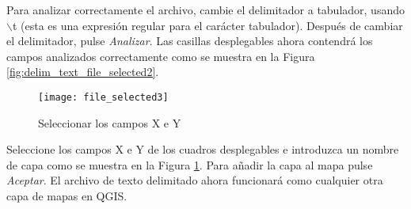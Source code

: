 Para analizar correctamente el archivo, cambie el delimitador a tabulador, 
usando \mbox{$\backslash$}t (esta es una expresión regular para el carácter 
tabulador). Después de cambiar el delimitador, pulse {\em Analizar}. Las 
casillas desplegables ahora contendrá los campos analizados correctamente como 
se muestra en la Figura \ref{fig:delim_text_file_selected2}.

\begin{figure}[ht]
   \begin{center}
   \caption{Seleccionar los campos X e Y}\label{fig:delim_text_file_selected3}\smallskip
\texttt{[image: file\_selected3]}
   \end{center}  
\end{figure}

Seleccione los campos X e Y de los cuadros desplegables e introduzca un nombre 
de capa como se muestra en la Figura \ref{fig:delim_text_file_selected3}. Para 
añadir la capa al mapa pulse {\em Aceptar}. El archivo de texto delimitado ahora funcionará como cualquier otra capa de mapas en QGIS.

